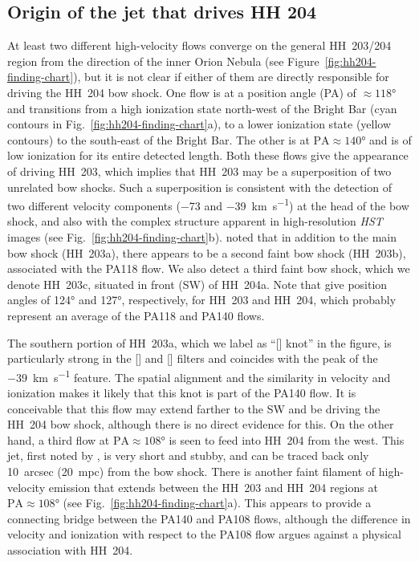 \documentclass[twocolumn]{aastex63}
\begin{document}
\subsection{Origin of the jet that drives HH 204}
\label{sec:origin-jet-that}

At least two different high-velocity flows
converge on the general HH~203/204 region
from the direction of the inner Orion Nebula (see Figure~\ref{fig:hh204-finding-chart}),
but it is not clear if either of them are directly responsible for driving the
HH~204 bow shock.
One flow is at a position angle (PA) of \(\approx \ang{118}\) and transitions 
from a high ionization state north-west of the Bright Bar
(cyan contours in Fig.~\ref{fig:hh204-finding-chart}a),
to a lower ionization state (yellow contours) to the south-east of the Bright Bar.
The other is at \(\mathrm{PA} \approx \ang{140}\)
and is of low ionization for its entire detected length. 
Both these flows give the appearance of driving HH~203,
which implies that HH~203 may be a superposition of two unrelated bow shocks.
Such a superposition is consistent with the detection of two
different velocity components (\num{-73} and \SI{-39}{km.s^{-1}})
at the head of the bow shock, and also with the complex structure
apparent in high-resolution \textit{HST} images (see Fig.~\ref{fig:hh204-finding-chart}b).
\citet{ODell:2015a} noted that in addition to the main bow shock (HH~203a),
there appears to be a second faint bow shock (HH~203b), associated with
the PA118 flow.
We also detect a third faint bow shock, which we denote HH~203c,
situated in front (SW) of HH~204a.
Note that \citet{ODell:2015a} give position angles of \ang{124} and \ang{127},
respectively, for HH~203 and HH~204, which probably represent an average of the 
PA118 and PA140 flows. 

The southern portion of HH~203a,
which we label as ``[] knot'' in the figure,
is particularly strong in the [] and [] filters
and coincides with the peak of the \SI{-39}{km.s^{-1}} feature.
The spatial alignment and the similarity in velocity and ionization makes it likely that this
knot is part of the PA140 flow.
It is conceivable that this flow may extend farther to the SW and
be driving the HH~204 bow shock,
although there is no direct evidence for this.
On the other hand, a third flow at \(\mathrm{PA} \approx \ang{108}\) is seen to feed into HH~204
from the west.
This jet, first noted by \cite{Doi:2004a}, is very short and stubby,
and can be traced back only \SI{10}{arcsec} (\SI{20}{mpc}) from the bow shock.
There is another faint filament of high-velocity \oiii{} emission that extends between the
HH~203 and HH~204 regions at \(\mathrm{PA} \approx \ang{108}\)
(see Fig.~\ref{fig:hh204-finding-chart}a).
This appears to provide a connecting bridge
between the PA140 and PA108 flows, although the difference
in velocity and ionization with respect to the PA108 flow argues against
a physical association with HH~204. 
\end{document}
